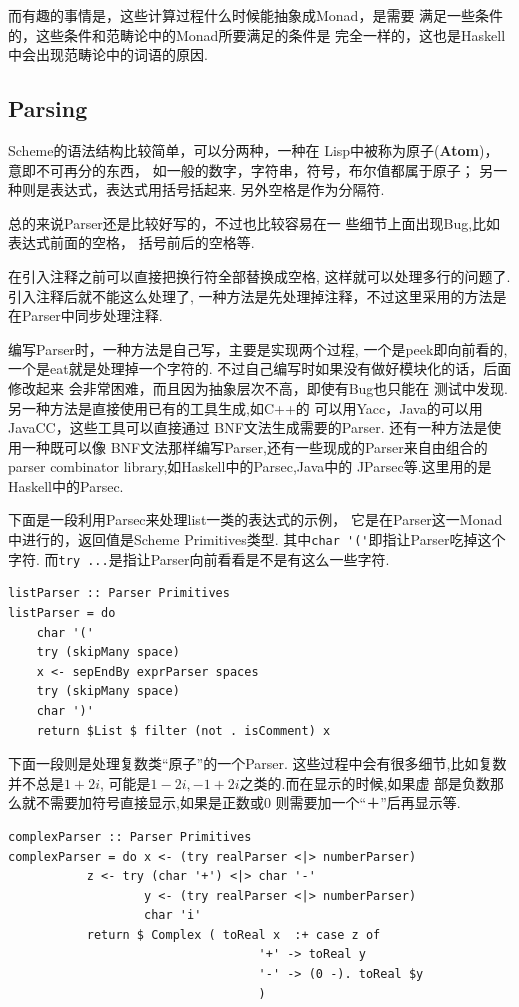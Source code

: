 \documentclass[11pt]{article}
\theoremstyle{definition}
\theoremstyle{remark}
\numberwithin{equation}{section}
\begin{document}
而有趣的事情是，这些计算过程什么时候能抽象成Monad，是需要
满足一些条件的，这些条件和范畴论中的Monad所要满足的条件是
完全一样的，这也是Haskell中会出现范畴论中的词语的原因.
\subsection{Parsing}
Scheme的语法结构比较简单，可以分两种，一种在
Lisp中被称为原子({\bf Atom})，意即不可再分的东西，
如一般的数字，字符串，符号，布尔值都属于原子；
另一种则是表达式，表达式用括号括起来.
另外空格是作为分隔符.

总的来说Parser还是比较好写的，不过也比较容易在一
些细节上面出现Bug,比如表达式前面的空格，
括号前后的空格等.

在引入注释之前可以直接把换行符全部替换成空格,
这样就可以处理多行的问题了.引入注释后就不能这么处理了,
一种方法是先处理掉注释，不过这里采用的方法是
在Parser中同步处理注释.

编写Parser时，一种方法是自己写，主要是实现两个过程,
一个是peek即向前看的,一个是eat就是处理掉一个字符的.
不过自己编写时如果没有做好模块化的话，后面修改起来
会非常困难，而且因为抽象层次不高，即使有Bug也只能在
测试中发现.另一种方法是直接使用已有的工具生成,如C++的
可以用Yacc，Java的可以用JavaCC，这些工具可以直接通过
BNF文法生成需要的Parser. 还有一种方法是使用一种既可以像
BNF文法那样编写Parser,还有一些现成的Parser来自由组合的
parser combinator library,如Haskell中的Parsec,Java中的
JParsec等.这里用的是Haskell中的Parsec.

下面是一段利用Parsec来处理list一类的表达式的示例，
它是在Parser这一Monad中进行的，返回值是Scheme Primitives类型.
其中\verb|char '('|即指让Parser吃掉这个字符.
而\verb|try ...|是指让Parser向前看看是不是有这么一些字符.
\begin{verbatim}
listParser :: Parser Primitives
listParser = do
	char '('
	try (skipMany space)
	x <- sepEndBy exprParser spaces 
	try (skipMany space)
	char ')'
	return $List $ filter (not . isComment) x
  \end{verbatim}
  下面一段则是处理复数类“原子”的一个Parser.
  这些过程中会有很多细节,比如复数并不总是$1+2i$,
  可能是$1-2i,-1+2i$之类的.而在显示的时候,如果虚
  部是负数那么就不需要加符号直接显示,如果是正数或0
  则需要加一个“＋”后再显示等.

\begin{verbatim}
complexParser :: Parser Primitives
complexParser = do x <- (try realParser <|> numberParser)
		   z <- try (char '+') <|> char '-'
                   y <- (try realParser <|> numberParser)
                   char 'i' 
		   return $ Complex ( toReal x  :+ case z of
							       '+' -> toReal y
							       '-' -> (0 -). toReal $y
							       )

  \end{verbatim}
\end{document}
